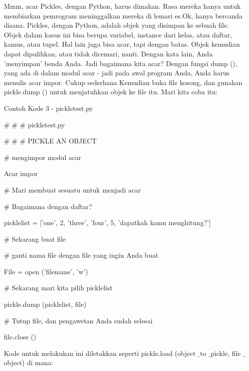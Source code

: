 Mmm, acar Pickles, dengan Python, harus dimakan. Rasa mereka hanya untuk membiarkan pemrogram meninggalkan mereka di lemari es.Ok, hanya bercanda disana. Pickles, dengan Python, adalah objek yang disimpan ke sebuah file. Objek dalam kasus ini bisa berupa variabel, instance dari kelas, atau daftar, kamus, atau tupel. Hal lain juga bisa acar, tapi dengan batas. Objek kemudian dapat dipulihkan, atau tidak dicemari, nanti. Dengan kata lain, Anda 'menyimpan' benda Anda. Jadi bagaimana kita acar? Dengan fungsi dump (), yang ada di dalam modul acar - jadi pada awal program Anda, Anda harus menulis acar impor. Cukup sederhana Kemudian buka file kosong, dan gunakan pickle.dump () untuk menjatuhkan objek ke file itu. Mari kita coba itu: \par
\noindent 
Contoh Kode 3 - pickletest.py \par
\vspace{12pt}
\noindent 
$  \#  $ $  \#  $ $  \#  $ pickletest.py \par
\noindent 
$  \#  $ $  \#  $ $  \#  $ PICKLE AN OBJECT \par
\vspace{12pt}
\noindent 
$  \#  $ mengimpor modul acar \par
\noindent 
Acar impor \par
\vspace{12pt}
\noindent 
$  \#  $ Mari membuat sesuatu untuk menjadi acar \par
\noindent 
$  \#  $ Bagaimana dengan daftar? \par
\noindent 
picklelist = ['one', 2, 'three', 'four', 5, 'dapatkah kamu menghitung?'] \par
\vspace{12pt}
\noindent 
$  \#  $ Sekarang buat file \par
\noindent 
$  \#  $ ganti nama file dengan file yang ingin Anda buat \par
\noindent 
File = open ('filename', 'w') \par
\vspace{12pt}
\noindent 
$  \#  $ Sekarang mari kita pilih picklelist \par
\noindent 
pickle.dump (picklelist, file) \par
\vspace{12pt}
\noindent 
$  \#  $ Tutup file, dan pengawetan Anda sudah selesai \par
\noindent 
file.close () \par
\vspace{12pt}
\noindent 
Kode untuk melakukan ini diletakkan seperti pickle.load (object $  \_  $to $  \_  $pickle, file $  \_  $object) di mana: \par
